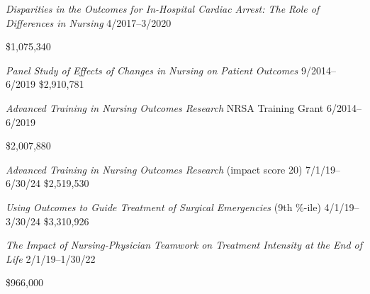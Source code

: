 \documentclass[10pt,]{article}
\begin{document}
{{{{{{{{{{{\textit {Disparities in the Outcomes for In-Hospital Cardiac Arrest: The Role of Differences in Nursing} \hfill 4/2017--3/2020 \newline
{	\hfill \$1,075,340

\textit {Panel Study of Effects of Changes in Nursing on Patient Outcomes} \hfill 9/2014--6/2019 \newline
{}	\hfill \$2,910,781

\textit {Advanced Training in Nursing Outcomes Research} NRSA Training Grant \hfill 6/2014--6/2019 \newline
{	\hfill \$2,007,880

\vspace{4mm}


\textit {Advanced Training in Nursing Outcomes Research} (impact score 20) \hfill  7/1/19--6/30/24 \newline
{} \hfill \$2,519,530

\textit {Using Outcomes to Guide Treatment of Surgical Emergencies} (9{\small{th}} {\small{\%-ile}}) \hfill 4/1/19--3/30/24 \newline
{}	\hfill \$3,310,926

\textit {The Impact of Nursing-Physician Teamwork on Treatment Intensity at the End of Life} \hfill 2/1/19--1/30/22 \newline
{	\hfill \$966,000

\vspace{4mm}

}}}}}}}}}}}}}}
\end{document}
